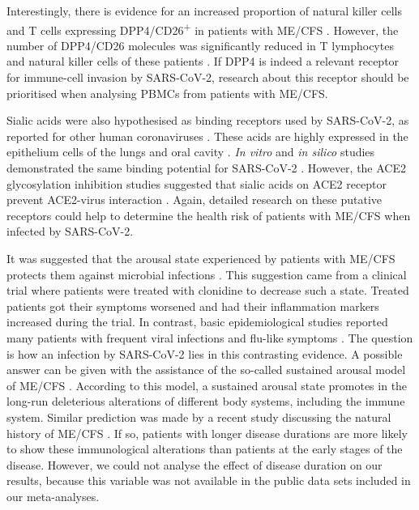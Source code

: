 Interestingly, there is evidence for an increased proportion of natural killer cells and T cells expressing DPP4/CD26\textsuperscript{+} in patients with ME/CFS \citep{klimas1990ImmunologicAbnormalitiesa, fletcher2010BiomarkersChronic}. However, the number of DPP4/CD26 molecules was significantly reduced in T lymphocytes and natural killer cells of these patients \citep{fletcher2010BiomarkersChronic}. If DPP4 is indeed a relevant receptor for immune-cell invasion by SARS-CoV-2, research about this receptor should be prioritised when analysing PBMCs from patients with ME/CFS.

Sialic acids were also hypothesised as binding receptors used by SARS-CoV-2, as reported for other human coronaviruses \citep{sun2021RoleCell}. These acids are highly expressed in the epithelium cells of the lungs and oral cavity \citep{cross2018GlycanRecognition}. \textit{In vitro} and \textit{in silico} studies demonstrated the same binding potential for SARS-CoV-2 \citep{awasthi2020SialosideBindingPocket, baker2020SARSCOV2Spike, milanetti2021InSilicoEvidence}. However, the ACE2 glycosylation inhibition studies suggested that sialic acids on ACE2 receptor prevent ACE2-virus interaction \citep{chu2021HostViral, yang2020InhibitionSARSCoV2}. Again, detailed research on these putative receptors could help to determine the health risk of patients with ME/CFS when infected by SARS-CoV-2.

It was suggested that the arousal state experienced by patients with ME/CFS protects them against microbial infections \citep{sulheim2014DiseaseMechanisms}. This suggestion came from a clinical trial where patients were treated with clonidine to decrease such a state. Treated patients got their symptoms worsened and had their inflammation markers increased during the trial. In contrast, basic epidemiological studies reported many patients with frequent viral infections and flu-like symptoms \citep{johnston2016EpidemiologicalCharacteristics, chu2019OnsetPatterns, slomko2019PrevalenceCharacteristics}. The question is how an infection by SARS-CoV-2 lies in this contrasting evidence. A possible answer can be given with the assistance of the so-called sustained arousal model of ME/CFS \citep{wyller2009CanSustained}. According to this model, a sustained arousal state promotes in the long-run deleterious alterations of different body systems, including the immune system. Similar prediction was made by a recent study discussing the natural history of ME/CFS \citep{nacul2020HowMyalgic}. If so, patients with longer disease durations are more likely to show these immunological alterations than patients at the early stages of the disease. However, we could not analyse the effect of disease duration on our results, because this variable was not available in the public data sets included in our meta-analyses.

